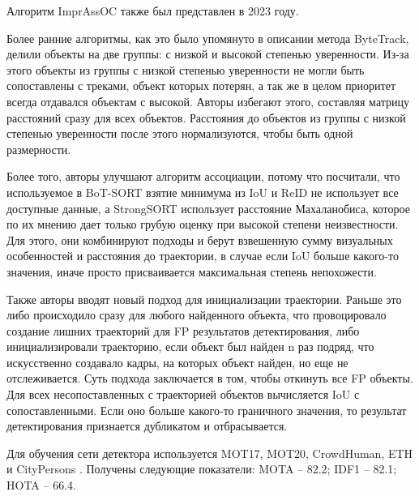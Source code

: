 Алгоритм ImprAssOC \cite{stadler2023improved} также был представлен в 2023 году. 

Более ранние алгоритмы, как это было упомянуто в описании метода ByteTrack, делили объекты на две группы: с низкой и высокой степенью уверенности. 
Из-за этого объекты из группы с низкой степенью уверенности не могли быть сопоставлены с треками, объект которых потерян, а так же в целом приоритет всегда отдавался объектам с высокой. 
Авторы избегают этого, составляя матрицу расстояний сразу для всех объектов. Расстояния до объектов из группы с низкой степенью уверенности после этого нормализуются, чтобы быть одной размерности. 

Более того, авторы улучшают алгоритм ассоциации, потому что посчитали, что используемое в BoT-SORT взятие минимума из IoU и ReID не использует все доступные данные, а StrongSORT использует расстояние Махаланобиса, которое по их мнению дает только грубую оценку при высокой степени неизвестности.
Для этого, они комбинируют подходы и берут взвешенную сумму визуальных особенностей и расстояния до траектории, в случае если IoU больше какого-то значения, иначе просто присваивается максимальная степень непохожести.

Также авторы вводят новый подход для инициализации траектории. Раньше это либо происходило сразу для любого найденного объекта, что провоцировало создание лишних траекторий для FP результатов детектирования, либо инициализировали траекторию, если объект был найден n раз подряд, что искусственно создавало кадры, на которых объект найден, но еще не отслеживается. 
Суть подхода заключается в том, чтобы откинуть все FP объекты. Для всех несопоставленных с траекторией объектов вычисляется IoU с сопоставленными. Если оно больше какого-то граничного значения, то результат детектирования признается дубликатом и отбрасывается. 

Для обучения сети детектора используется MOT17, MOT20, CrowdHuman, ETH и CityPersons \cite{zhang2017citypersons}. Получены следующие показатели: MOTA -- 82.2; IDF1 -- 82.1; HOTA -- 66.4.